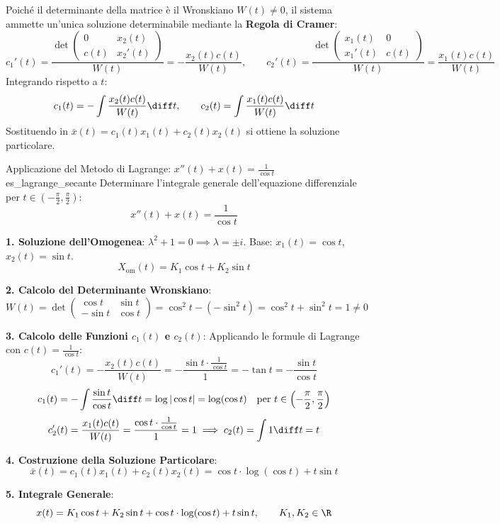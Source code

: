 \begin{dimostrazione}
\[\]
Poiché il determinante della matrice è il Wronskiano $W(t) \neq 0$, il sistema ammette un'unica soluzione determinabile mediante la \textbf{Regola di Cramer}:
\begin{equation}
    \label{eq:cramer_c1_c2}
    c_1'(t) = \frac{\det \begin{pmatrix} 0 & x_2(t) \\ c(t) & x_2'(t) \end{pmatrix}}{W(t)} = -\frac{x_2(t) c(t)}{W(t)}, \qquad c_2'(t) = \frac{\det \begin{pmatrix} x_1(t) & 0 \\ x_1'(t) & c(t) \end{pmatrix}}{W(t)} = \frac{x_1(t) c(t)}{W(t)}
\end{equation}
Integrando rispetto a $t$:
\begin{equation}
    \label{eq:lagrange_formule_integrali}
    c_1(t) = -\int \frac{x_2(t) c(t)}{W(t)} \diff t, \qquad c_2(t) = \int \frac{x_1(t) c(t)}{W(t)} \diff t
\end{equation}
Sostituendo in $\bar{x}(t) = c_1(t)x_1(t) + c_2(t)x_2(t)$ si ottiene la soluzione particolare.
\end{dimostrazione}

\begin{esempio}{Applicazione del Metodo di Lagrange: $x''(t) + x(t) = \frac{1}{\cos t}$}{es_lagrange_secante}
Determinare l'integrale generale dell'equazione differenziale per $t \in \left(-\frac{\pi}{2}, \frac{\pi}{2}\right)$:
\[
    x''(t) + x(t) = \frac{1}{\cos t}
\]

\textbf{1. Soluzione dell'Omogenea}:
$\lambda^2 + 1 = 0 \implies \lambda = \pm i$. Base: $x_1(t) = \cos t$, $x_2(t) = \sin t$.
\[
    X_{\text{om}}(t) = K_1 \cos t + K_2 \sin t
\]

\textbf{2. Calcolo del Determinante Wronskiano}:
\[
    W(t) = \det \begin{pmatrix} \cos t & \sin t \\ -\sin t & \cos t \end{pmatrix} = \cos^2 t - (-\sin^2 t) = \cos^2 t + \sin^2 t = 1 \neq 0
\]

\textbf{3. Calcolo delle Funzioni $c_1(t)$ e $c_2(t)$}:
Applicando le formule di Lagrange con $c(t) = \frac{1}{\cos t}$:
\[
    c_1'(t) = -\frac{x_2(t) c(t)}{W(t)} = -\frac{\sin t \cdot \frac{1}{\cos t}}{1} = -\tan t = -\frac{\sin t}{\cos t}
\]
\[
    c_1(t) = -\int \frac{\sin t}{\cos t} \diff t = \log|\cos t| = \log(\cos t) \quad \text{per } t \in \left(-\frac{\pi}{2}, \frac{\pi}{2}\right)
\]
\[
    c_2'(t) = \frac{x_1(t) c(t)}{W(t)} = \frac{\cos t \cdot \frac{1}{\cos t}}{1} = 1 \implies c_2(t) = \int 1 \diff t = t
\]

\textbf{4. Costruzione della Soluzione Particolare}:
\[
    \bar{x}(t) = c_1(t) x_1(t) + c_2(t) x_2(t) = \cos t \cdot \log(\cos t) + t \sin t
\]

\textbf{5. Integrale Generale}:
\[
    x(t) = K_1 \cos t + K_2 \sin t + \cos t \cdot \log(\cos t) + t \sin t, \qquad K_1, K_2 \in \R
\]
\end{esempio}

